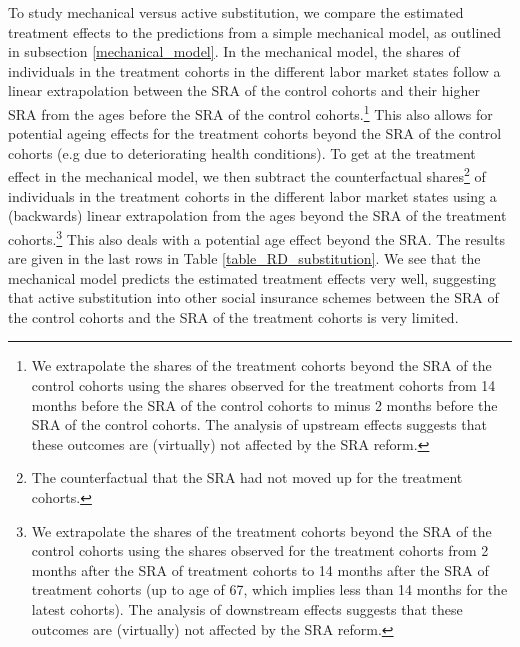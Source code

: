 \documentclass[12pt,a4paper]{article}
\begin{document}
To study mechanical versus active substitution, we compare the estimated treatment effects to the predictions from a simple mechanical model, as outlined in subsection \ref{mechanical_model}. In the mechanical model, the shares of individuals in the treatment cohorts in the different labor market states follow a linear extrapolation between the SRA of the control cohorts and their higher SRA from the ages before the SRA of the control cohorts.\footnote{We extrapolate the shares of the treatment cohorts beyond the SRA of the control cohorts using the shares observed for the treatment cohorts from 14 months before the SRA of the control cohorts to minus 2 months before the SRA of the control cohorts. The analysis of upstream effects suggests that these outcomes are (virtually) not affected by the SRA reform.} This also allows for potential ageing effects for the treatment cohorts beyond the SRA of the control cohorts (e.g due to deteriorating health conditions). To get at the treatment effect in the mechanical model, we then subtract the counterfactual shares\footnote{The counterfactual that the SRA had not moved up for the treatment cohorts.} of individuals in the treatment cohorts in the different labor market states using a (backwards) linear extrapolation from the ages beyond the SRA of the treatment cohorts.\footnote{We extrapolate the shares of the treatment cohorts beyond the SRA of the control cohorts using the shares observed for the treatment cohorts from 2 months after the SRA of treatment cohorts to 14 months after the SRA of treatment cohorts (up to age of 67, which implies less than 14 months for the latest cohorts). The analysis of downstream effects suggests that these outcomes are (virtually) not affected by the SRA reform.} This also deals with a potential age effect beyond the SRA. The results are given in the last rows in Table \ref{table_RD_substitution}. We see that the mechanical model predicts the estimated treatment effects very well, suggesting that active substitution into other social insurance schemes between the SRA of the control cohorts and the SRA of the treatment cohorts is very limited.

%		
\end{document}
